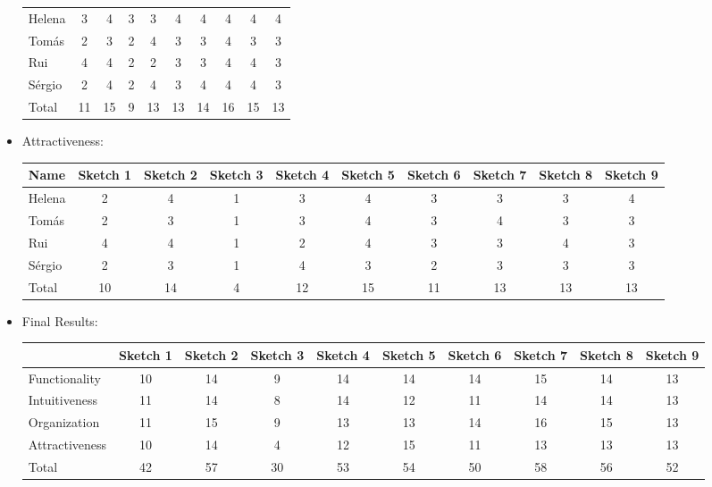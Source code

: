 \begin{itemize}
\begin{table}[H]
\begin{tabular}{l*{9}{c}}
        Helena & 3 & 4 & 3 & 3 & 4 & 4 & 4 & 4 & 4 \\
        Tomás & 2 & 3 & 2 & 4 & 3 & 3 & 4 & 3 & 3 \\ 
        Rui & 4 & 4 & 2 & 2 & 3 & 3 & 4 & 4 & 3 \\ 
        Sérgio & 2 & 4 & 2 & 4 & 3 & 4 & 4 & 4 & 3 \\ 
        \hline
        Total & 11 & 15 & 9 & 13 & 13 & 14 & 16 & 15 & 13 \\
    \end{tabular}
\end{table}
\item Attractiveness: 
\begin{table}[H]
    \begin{tabular}{l*{9}{c}}
        Name & Sketch 1 & Sketch 2 & Sketch 3 & Sketch 4 
        & Sketch 5 & Sketch 6 & Sketch 7 & Sketch 8 & Sketch 9 \\
        \hline 
        Helena & 2 & 4 & 1 & 3 & 4 & 3 & 3 & 3 & 4 \\
        Tomás & 2 & 3 & 1 & 3 & 4 & 3 & 4 & 3 & 3 \\ 
        Rui & 4 & 4 & 1 & 2 & 4 & 3 & 3 & 4 & 3 \\ 
        Sérgio & 2 & 3 & 1 & 4 & 3 & 2 & 3 & 3 & 3 \\ 
        \hline
        Total & 10 & 14 & 4 & 12 & 15 & 11 & 13 & 13 & 13 \\
    \end{tabular}
\end{table}
\item Final Results:
\begin{table}[H]
    \begin{tabular}{l*{9}{c}}
        & Sketch 1 & Sketch 2 & Sketch 3 & Sketch 4 
        & Sketch 5 & Sketch 6 & Sketch 7 & Sketch 8 & Sketch 9 \\
        \hline 
        Functionality & 10 & 14 & 9 & 14 & 14 & 14 & 15 & 14 & 13 \\
        Intuitiveness & 11 & 14 & 8 & 14 & 12 & 11 & 14 & 14 & 13 \\ 
        Organization & 11 & 15 & 9 & 13 & 13 & 14 & 16 & 15 & 13 \\ 
        Attractiveness & 10 & 14 & 4 & 12 & 15 & 11 & 13 & 13 & 13 \\ 
        \hline
        Total & 42 & 57 & 30 & 53 & 54 & 50 & 58 & 56 & 52 \\
    \end{tabular}
\end{table}
\end{itemize} \par
